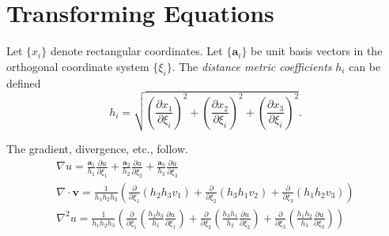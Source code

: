 \flushbottom



\chapter{Transforming Equations}




Let $\{ x_i \}$ denote rectangular coordinates.  Let 
$\{ \mathbf{a}_i \}$ be unit basis vectors in the orthogonal
coordinate system $\{ \xi_i \}$.  The 
\textit{distance metric coefficients}
$h_i$ can be defined
\[
h_i = \sqrt{ \left( \frac{\partial x_1}{\partial \xi_i} \right)^2 
  + \left( \frac{\partial x_2}{\partial \xi_i} \right)^2 
  + \left( \frac{\partial x_3}{\partial \xi_i} \right)^2 }.
\]


The gradient, divergence, etc., follow.
\begin{gather*}
  \nabla u = \frac{ \mathbf{a}_1 }{ h_1 } \frac{\partial u}{\partial \xi_1}
  + \frac{ \mathbf{a}_2 }{ h_2 } \frac{\partial u}{\partial \xi_2}
  + \frac{ \mathbf{a}_3 }{ h_3 } \frac{\partial u}{\partial \xi_3} \\
  \nabla \cdot \mathbf{v} = \frac{1}{h_1 h_2 h_3} \left(
    \frac{\partial}{\partial \xi_1}(h_2 h_3 v_1)
    + \frac{\partial}{\partial \xi_2}(h_3 h_1 v_2)
    + \frac{\partial}{\partial \xi_3}(h_1 h_2 v_3) \right) \\
  \nabla^2 u = \frac{1}{h_1 h_2 h_3} \left(
    \frac{\partial}{\partial \xi_1} \left( \frac{h_2 h_3}{h_1}
      \frac{\partial u}{\partial \xi_1} \right)
    + \frac{\partial}{\partial \xi_2} \left( \frac{h_3 h_1}{h_2}
      \frac{\partial u}{\partial \xi_2} \right)
    + \frac{\partial}{\partial \xi_3} \left( \frac{h_1 h_2}{h_3}
      \frac{\partial u}{\partial \xi_3} \right) \right)
\end{gather*}






